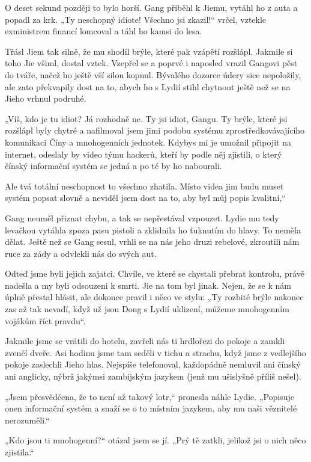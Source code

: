 O deset sekund později to bylo horší. Gang přiběhl k Jiemu, vytáhl ho z auta a popadl za krk. „Ty neschopný idiote! Všechno jsi zkazil!“ vrčel, vztekle exministrem financí lomcoval a táhl ho kamsi do lesa.

Třásl Jiem tak silně, že mu shodil brýle, které pak vzápětí rozšlápl. Jakmile si toho Jie všiml, dostal vztek. Vzepřel se a poprvé i naposled vrazil Gangovi pěst do tváře, načež ho ještě vší silou kopnul. Bývalého dozorce údery sice nepoložily, ale zato překvapily dost na to, abych ho s Lydií stihl chytnout ještě než se na Jieho vrhnul podruhé.

„Víš, kdo je tu idiot? Já rozhodně ne. Ty jsi idiot, Gangu. Ty brýle, které jsi rozšlápl byly chytré a nafilmoval jsem jimi podobu systému zprostředkovávajícího komunikaci Číny a mnohogenních jednotek. Kdybys mi je umožnil připojit na internet, odeslaly by video týmu hackerů, kteří by podle něj zjistili, o který čínský informační systém se jedná a po té by ho nabourali.

Ale tvá totální neschopnost to všechno zhatila. Místo videa jim budu muset systém popsat slovně a neviděl jsem dost na to, aby byl můj popis kvalitní,“

Gang neuměl přiznat chybu, a tak se nepřestával vzpouzet. Lydie mu tedy levačkou vytáhla zpoza pasu pistoli a zklidnila ho ťuknutím do hlavy. To neměla dělat. Ještě než se Gang sesul, vrhli se na nás jeho druzi rebelové, zkroutili nám ruce za zády a odvlekli nás do svých aut.

Odteď jsme byli jejich zajatci. Chvíle, ve které se chystali přebrat kontrolu, právě nadešla a my byli odsouzeni k smrti. Jie na tom byl jinak. Nejen, že se k nám úplně přestal hlásit, ale dokonce pravil i něco ve stylu: „Ty rozbité brýle nakonec zas až tak nevadí, když už jsou Dong s Lydií uklizení, můžeme mnohogenním vojákům říct pravdu“.
 
Jakmile jsme se vrátili do hotelu, zavřeli nás ti hrdlořezi do pokoje a zamkli zvenčí dveře. Asi hodinu jsme tam seděli v tichu a strachu, když jsme z vedlejšího pokoje zaslechli Jieho hlas. Nejspíše telefonoval, každopádně nemluvil ani čínský ani anglicky, nýbrž jakýmsi zambijským jazykem (jenž mu ušislyšně příliš nešel).

„Jsem přesvědčena, že to není až takový lotr,“ pronesla náhle Lydie. „Popisuje onen informační systém a snaží se o to místním jazykem, aby mu naši věznitelé nerozuměli.“

„Kdo jsou ti mnohogenní?“ otázal jsem se jí. „Prý tě zatkli, jelikož jsi o nich něco zjistila.“

